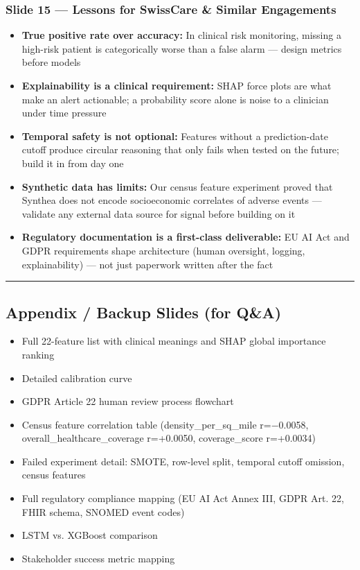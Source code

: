 \documentclass[11pt,a4paper]{article}
\begin{document}
\subsubsection{Slide 15 --- Lessons for SwissCare \& Similar Engagements}
\begin{itemize}
\item \textbf{True positive rate over accuracy:} In clinical risk monitoring, missing a high-risk patient is categorically worse than a false alarm --- design metrics before models
\item \textbf{Explainability is a clinical requirement:} SHAP force plots are what make an alert actionable; a probability score alone is noise to a clinician under time pressure
\item \textbf{Temporal safety is not optional:} Features without a prediction-date cutoff produce circular reasoning that only fails when tested on the future; build it in from day one
\item \textbf{Synthetic data has limits:} Our census feature experiment proved that Synthea does not encode socioeconomic correlates of adverse events --- validate any external data source for signal before building on it
\item \textbf{Regulatory documentation is a first-class deliverable:} EU AI Act and GDPR requirements shape architecture (human oversight, logging, explainability) --- not just paperwork written after the fact
\end{itemize}

\noindent\rule{\linewidth}{0.4pt}

\subsection{Appendix / Backup Slides (for Q\&A)}

\begin{itemize}
\item Full 22-feature list with clinical meanings and SHAP global importance ranking
\item Detailed calibration curve
\item GDPR Article 22 human review process flowchart
\item Census feature correlation table (density\_per\_sq\_mile r=$-$0.0058, overall\_healthcare\_coverage r=+0.0050, coverage\_score r=+0.0034)
\item Failed experiment detail: SMOTE, row-level split, temporal cutoff omission, census features
\item Full regulatory compliance mapping (EU AI Act Annex III, GDPR Art. 22, FHIR schema, SNOMED event codes)
\item LSTM vs. XGBoost comparison
\item Stakeholder success metric mapping
\end{itemize}
\end{document}
